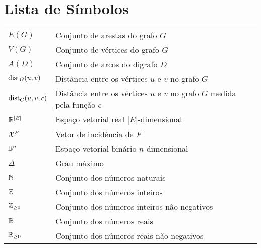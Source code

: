 \chapter{Lista de Símbolos}
\begin{tabular}{ll}
  $E(G)$        & Conjunto de arestas do grafo $G$\\
  $V(G)$        & Conjunto de vértices do grafo $G$\\
  $A(D)$        & Conjunto de arcos do digrafo $D$\\
  ${\mathrm{dist}}_{G}(u,v)$ & Distância entre os vértices $u$ e $v$ no grafo $G$\\
  ${\mathrm{dist}}_{G}(u,v,c)$ & Distância entre os vértices $u$ e $v$ no grafo $G$ medida pela função $c$\\

  $\mathbb{R}^{|E|}$    & Espaço vetorial real $|E|$-dimensional\\
  $\mathcal{X}^{F}$  & Vetor de incidência de $F$\\
  $\mathbb{B}^{n}$      & Espaço vetorial binário $n$-dimensional\\
  $\Delta$      & Grau máximo\\
  $\mathbb{N}$	& Conjunto dos números naturais\\
  $\mathbb{Z}$	& Conjunto dos números inteiros\\
  $\mathbb{Z}_{\ge 0}$ & Conjunto dos números inteiros não negativos\\
  $\mathbb{R}$		& Conjunto dos números reais\\
  $\mathbb{R}_{\ge 0}$	& Conjunto dos números reais não negativos\\
\end{tabular}

